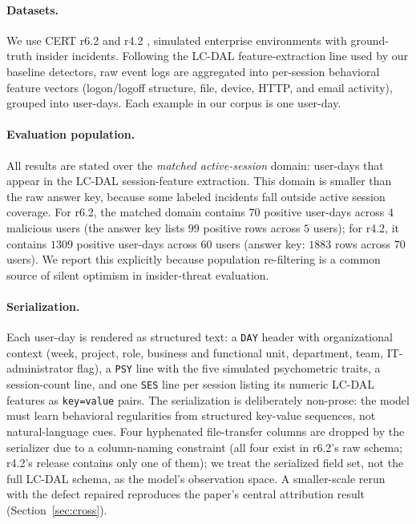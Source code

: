 \documentclass[10pt]{article} %
\newcommand{\rsix}{r6.2}
\newcommand{\rfour}{r4.2}
\begin{document}
\paragraph{Datasets.}
We use CERT \rsix{} and \rfour{} \citep{glasser2013bridging,certdataset},
simulated enterprise environments with ground-truth insider incidents.
Following the LC-DAL feature-extraction line used by our baseline detectors, raw
event logs are aggregated into per-session behavioral feature vectors
(logon/logoff structure, file, device, HTTP, and email activity), grouped into
user-days. Each example in our corpus is one user-day.

\paragraph{Evaluation population.}
All results are stated over the \emph{matched active-session} domain: user-days
that appear in the LC-DAL session-feature extraction. This domain is smaller
than the raw answer key, because some labeled incidents fall outside active
session coverage. For \rsix{}, the matched domain contains $70$ positive
user-days across $4$ malicious users (the answer key lists $99$ positive rows
across $5$ users); for \rfour{}, it contains $1309$ positive user-days across
$60$ users (answer key: $1883$ rows across $70$ users). We report this
explicitly because population re-filtering is a common source of silent
optimism in insider-threat evaluation.



\paragraph{Serialization.}
Each user-day is rendered as structured text: a \texttt{DAY} header with
organizational context (week, project, role, business and functional unit,
department, team, IT-administrator flag), a \texttt{PSY} line with the five
simulated psychometric traits, a session-count line, and one \texttt{SES} line
per session listing its numeric LC-DAL features as \texttt{key=value} pairs.
The serialization is deliberately non-prose: the model must learn behavioral
regularities from structured key-value sequences, not natural-language cues.
Four hyphenated file-transfer columns are dropped by the serializer due to a
column-naming constraint (all four exist in \rsix{}'s raw schema;
\rfour{}'s release contains only one of them); we treat the serialized
field set, not the full LC-DAL schema, as the model's observation space.
A smaller-scale rerun with the defect repaired reproduces the paper's
central attribution result (Section~\ref{sec:cross}).
\end{document}
